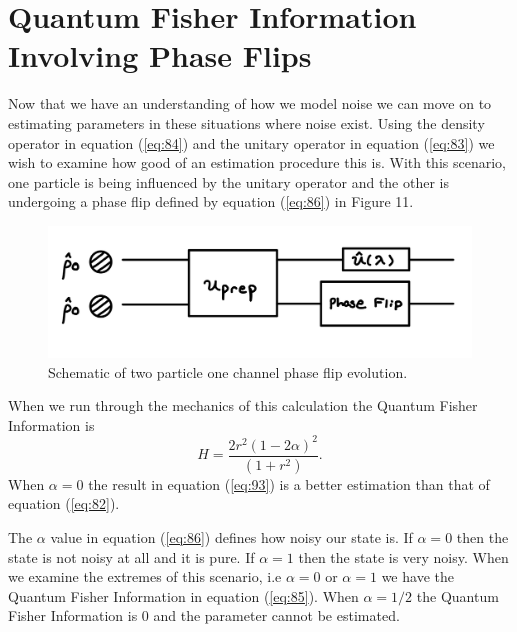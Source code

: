 \documentclass[twocolumn]{article}
\begin{document}
\section*{Quantum Fisher Information Involving Phase Flips}
Now that we have an understanding of how we model noise we can move on to estimating parameters in these situations where noise exist. Using the density operator in equation (\ref{eq:84}) and the unitary operator in equation (\ref{eq:83}) we wish to examine how good of an estimation procedure this is. With this scenario, one particle is being influenced by the unitary operator and the other is undergoing a phase flip defined by equation (\ref{eq:86}) in Figure 11. 
\begin{figure}[htpb]
\begin{center}
\includegraphics[width=0.90\linewidth]{Two-Particle-Phase-Flip.jpg}
\caption{Schematic of two particle one channel phase flip evolution.}
\end{center}
\end{figure}
\newline
When we run through the mechanics of this calculation the Quantum Fisher Information is
\begin{equation}\label{eq:93}
H=\frac{2r^2(1-2\alpha)^2}{(1+r^2)}.
\end{equation}
When $\alpha=0$ the result in equation (\ref{eq:93}) is a better estimation than that of equation (\ref{eq:82}).

The $\alpha$ value in equation (\ref{eq:86}) defines how noisy our state is. If $\alpha=0$ then the state is not noisy at all and it is pure. If $\alpha=1$ then the state is very noisy. When we examine the extremes of this scenario, i.e $\alpha=0$ or $\alpha=1$ we have the Quantum Fisher Information in equation (\ref{eq:85}). When $\alpha=1/2$ the Quantum Fisher Information is 0 and the parameter cannot be estimated.
\end{document}

